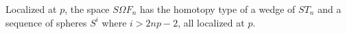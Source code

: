 Localized at $p$, the space $S\Omega F_n$ has the homotopy type of a wedge of $ST_n$ and a sequence of spheres $S^i$ where $i > 2np - 2$, all localized at $p$.
